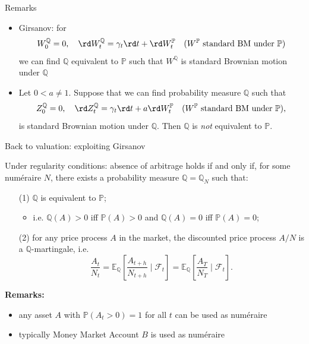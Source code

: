 \documentclass[pdf, handout]{beamer}
\renewcommand{\calF}{\mathcal{F}}
\begin{document}
\begin{frame}{Remarks}
\vspace{-.7cm}
\begin{itemize}
\item Girsanov: for
\[
W^{\mathbb{Q}}_0=0,\quad
\rd W^{\mathbb{Q}}_t=\gamma_t \rd t + \rd W^{\mathbb{P}}_t\quad ( W^{\mathbb{P}} \text{ standard BM  under } \mathbb{P} )
\]
we can find $\mathbb{Q}$ equivalent to $\mathbb{P}$ such that 
$W^{\mathbb{Q}}$
is  standard Brownian motion under $\mathbb{Q}$ 
\item Let $0<a\neq 1$. Suppose that we can find probability measure
$\mathbb{Q}$ such that
\[
Z^{\mathbb{Q}}_0=0,\quad
\rd Z^{\mathbb{Q}}_t=\gamma_t \rd t + a \rd W^{\mathbb{P}}_t\quad ( W^{\mathbb{P}} \text{ standard BM  under } \mathbb{P} ),
\]
is standard Brownian motion under $\mathbb{Q}$.
Then $\mathbb{Q}$ is \emph{not} equivalent to $\mathbb{P}$.
\end{itemize}
\end{frame}

\begin{frame}{Back to valuation: exploiting Girsanov}
\begin{theorem} Under regularity conditions: 
absence of arbitrage holds if and only if,
for some num\'{e}raire $N$, there exists a probability measure $\mathbb{Q}=\mathbb{Q}_N$ such that:
\begin{itemize}
\item[(1)] $\mathbb{Q}$ is equivalent to $\mathbb{P}$;
\begin{itemize}
\item i.e. $\mathbb{Q}(A)>0$ iff $\mathbb{P}(A)>0$ and $\mathbb{Q}(A)=0$ iff $\mathbb{P}(A)=0$;
\end{itemize}
\item[(2)] for any price process $A$ in the market, the discounted price process $A/N$ is a $\mathbb{Q}$-martingale, i.e. 
\[
\frac{A_t}{N_t}=\mathbb{E}_{\mathbb{Q}}\left[ \frac{A_{t+h}}{N_{t+h}} \mid \calF_t \right] 
=
\mathbb{E}_{\mathbb{Q}}\left[ \frac{A_{T}}{N_{T}} \mid \calF_t \right].
\]
\end{itemize}
\end{theorem}
\textbf{Remarks:}
\begin{itemize}
\item any asset $A$ with $\mathbb{P}(A_t > 0)=1$ for all $t$ can be used as num\'{e}raire
\item typically Money Market Account $B$ is used as num\'{e}raire 
\end{itemize}
%
\end{frame}
\end{document}
